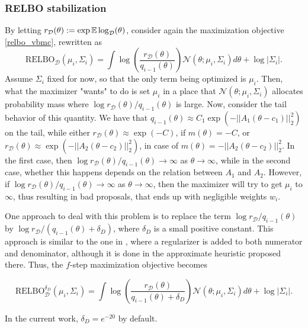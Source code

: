 \subsubsection{RELBO stabilization}
By letting $r_\mathcal{D}(\theta) := \exp {\mathbb E} \log_\mathcal{D}(\theta)$, consider again the maximization objective \eqref{relbo_vbmc}, rewritten as
\begin{equation}
 \text{RELBO}_\mathcal{D}(\mu_i,\Sigma_i) = \int \log \left(\frac{r_\mathcal{D}(\theta)}{q_{i-1}(\theta)} \right) \mathcal{N}(\theta;\mu_i,\Sigma_i) d \theta + \log |\Sigma_i|.
\end{equation}
Assume $\Sigma_i$ fixed for now, so that the only term being optimized is $\mu_i$. Then, what the maximizer "wants" to do is set $\mu_i$ in a place that $\mathcal{N}(\theta;\mu_i,\Sigma_i)$ allocates probability mass where $\log r_\mathcal{D}(\theta)/q_{i-1}(\theta)$ is large. Now, consider the tail behavior of this quantity. We have that $q_{i-1}(\theta) \approx C_1 \exp(-||A_1(\theta-c_1)||_2^2)$ on the tail, while either $r_\mathcal{D}(\theta) \approx \exp(-C)$, if $m(\theta) = -C$, or $r_\mathcal{D}(\theta) \approx \exp(-||A_2(\theta-c_2)||_2^2)$, in case of $m(\theta) = -||A_2(\theta-c_2)||_2^2$. In the first case, then $\log r_\mathcal{D}(\theta)/q_{i-1}(\theta) \to \infty$ as $\theta \to \infty$, while in the second case, whether this happens depends on the relation between $A_1$ and $A_2$. However, if $\log r_\mathcal{D}(\theta)/q_{i-1}(\theta) \to \infty$ as $\theta \to \infty$, then the maximizer will try to get $\mu_i$ to $\infty$, thus resulting in bad proposals, that ends up with negligible weights $w_i$.

One approach to deal with this problem is to replace the term $\log r_\mathcal{D}/q_{i-1}(\theta)$ by $\log r_\mathcal{D}/(q_{i-1}(\theta)+\delta_D)$, where $\delta_D$ is a small positive constant. This approach is similar to the one in \cite{Guo_2016}, where a regularizer is added to both numerator and denominator, although it is done in the approximate heuristic proposed there. Thus, the $f$-step maximization objective becomes

\begin{equation}
\text{RELBO}^{\delta_D}_\mathcal{D}(\mu_i,\Sigma_i) = \int \log \left(\frac{r_\mathcal{D}(\theta)}{q_{i-1}(\theta)+\delta_D} \right) \mathcal{N}(\theta;\mu_i,\Sigma_i) d \theta + \log |\Sigma_i|.
\end{equation}

In the current work, $\delta_D = e^{-20}$ by default.

